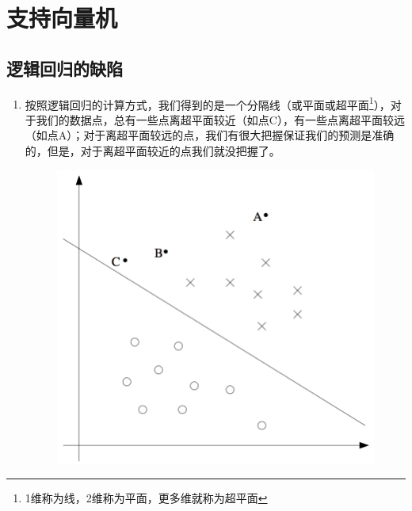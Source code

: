\section{支持向量机}

\subsection{逻辑回归的缺陷}
\begin{enumerate}
	\item 按照逻辑回归的计算方式，我们得到的是一个分隔线（或平面或超平面\footnote{1维称为线，2维称为平面，更多维就称为超平面}），对于我们的数据点，总有一些点离超平面较近（如点C），有一些点离超平面较远（如点A）；对于离超平面较远的点，我们有很大把握保证我们的预测是准确的，但是，对于离超平面较近的点我们就没把握了。
	\begin{figure}[htbp]
		\centering
		\includegraphics[scale=0.5]{images/逻辑回归缺陷讲述}
	\end{figure}
\end{enumerate}

